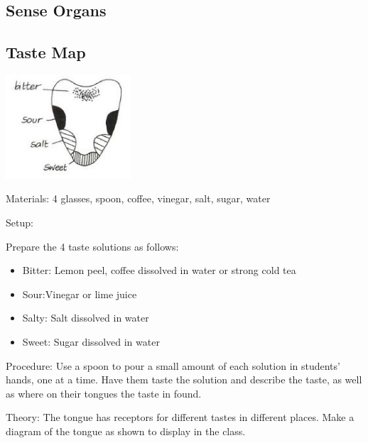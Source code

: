\begin{multicols}{2}
\columnbreak


\section*{Sense Organs} 


\subsection{Taste Map}

\begin{center}
\includegraphics[width=0.35\textwidth]{./img/vso/taste-map.jpg}
\end{center}

\begin{description*}
\item[Materials:]{4 glasses, spoon, coffee, vinegar, salt, sugar, water}
\item[Setup:]{Prepare the 4 taste solutions as follows:
\begin{itemize}
\item Bitter: Lemon peel, coffee dissolved in water or strong cold tea
\item Sour:Vinegar or lime juice
\item Salty: Salt dissolved in water
\item Sweet: Sugar dissolved in water
\end{itemize}}
\item[Procedure:]{Use a spoon to pour a small amount of each solution in students' hands, one at a time. Have them taste the solution and describe the taste, as well as where on their tongues the taste in found.}
\item[Theory:]{The tongue has receptors for different tastes in different places. Make a diagram of the tongue as shown to display in the class.}
\end{description*}


\end{multicols}
